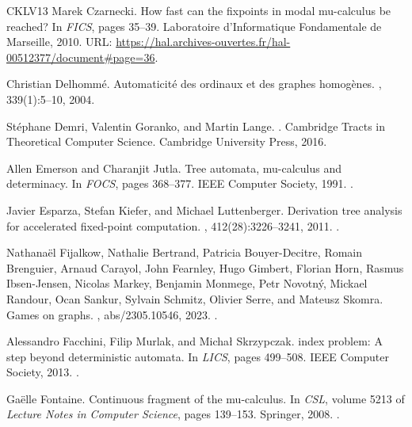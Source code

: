 \documentclass[11pt,a4paper]{amsart}
\theoremstyle{plain}
\theoremstyle{definition}
\theoremstyle{defC}
\theoremstyle{thmC}
\theoremstyle{plain}
\numberwithin{equation}{section}
\numberwithin{equation}{section}
\numberwithin{figure}{section}
\begin{document}
\begin{thebibliography}{CKLV13}
Marek Czarnecki.
\newblock How fast can the fixpoints in modal mu-calculus be reached?
\newblock In {\em {FICS}}, pages 35--39. Laboratoire d'Informatique
  Fondamentale de Marseille, 2010.
\newblock URL:
  \url{https://hal.archives-ouvertes.fr/hal-00512377/document\#page=36}.

Christian Delhomm\'e.
\newblock Automaticit\'e des ordinaux et des graphes homog\`enes.
,
  339(1):5--10, 2004.

St{\'{e}}phane Demri, Valentin Goranko, and Martin Lange.
.
\newblock Cambridge Tracts in Theoretical Computer Science. Cambridge
  University Press, 2016.

Allen Emerson and Charanjit Jutla.
\newblock Tree automata, mu-calculus and determinacy.
\newblock In {\em FOCS}, pages 368--377. {IEEE} Computer Society, 1991.
\newblock \href {https://doi.org/10.1109/SFCS.1991.185392}
  {}.

Javier Esparza, Stefan Kiefer, and Michael Luttenberger.
\newblock Derivation tree analysis for accelerated fixed-point computation.
, 412(28):3226--3241, 2011.
\newblock \href {https://doi.org/10.1016/J.TCS.2011.03.020}
  {}.

Nathana{\"{e}}l Fijalkow, Nathalie Bertrand, Patricia Bouyer{-}Decitre, Romain
  Brenguier, Arnaud Carayol, John Fearnley, Hugo Gimbert, Florian Horn, Rasmus
  Ibsen{-}Jensen, Nicolas Markey, Benjamin Monmege, Petr Novotn{\'{y}}, Mickael
  Randour, Ocan Sankur, Sylvain Schmitz, Olivier Serre, and Mateusz Skomra.
\newblock Games on graphs.
, abs/2305.10546, 2023.
\newblock \href {https://doi.org/10.48550/ARXIV.2305.10546}
  {}.

Alessandro Facchini, Filip Murlak, and Micha{\l} Skrzypczak.
 index problem: A step beyond deterministic
  automata.
\newblock In {\em LICS}, pages 499--508. {IEEE} Computer Society, 2013.
\newblock \href {https://doi.org/10.1109/LICS.2013.56}
  {}.

Ga{\"e}lle Fontaine.
\newblock Continuous fragment of the mu-calculus.
\newblock In {\em CSL}, volume 5213 of {\em Lecture Notes in Computer Science},
  pages 139--153. Springer, 2008.
\newblock \href {https://doi.org/10.1007/978-3-540-87531-4_12}
  {}.


\end{thebibliography}
\end{document}
